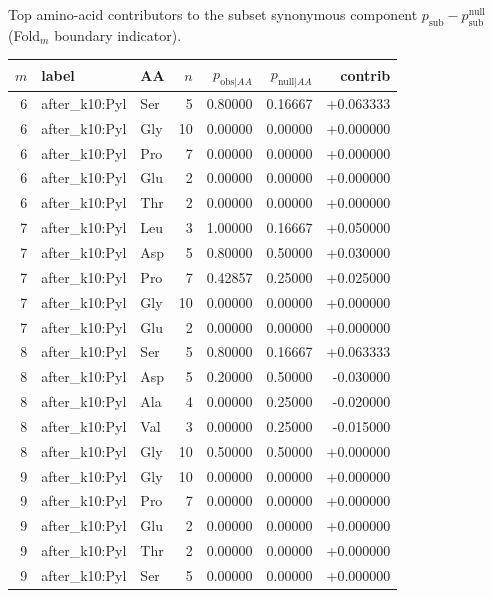 Top amino-acid contributors to the subset synonymous component $p_{\mathrm{sub}}-p^{\mathrm{null}}_{\mathrm{sub}}$ (Fold$_m$ boundary indicator).

\begingroup
{}
\scriptsize
\setlength{\tabcolsep}{4pt}
\renewcommand{\arraystretch}{1.10}
\setlength{\LTleft}{0pt}
\setlength{\LTright}{0pt}
\begin{longtable}{r l l r r r r}
\toprule
$m$ & label & AA & $n$ & $p_{\mathrm{obs}|AA}$ & $p_{\mathrm{null}|AA}$ & contrib \\
\midrule
6 & after\_k10:Pyl & Ser & 5 & 0.80000 & 0.16667 & +0.063333 \\
6 & after\_k10:Pyl & Gly & 10 & 0.00000 & 0.00000 & +0.000000 \\
6 & after\_k10:Pyl & Pro & 7 & 0.00000 & 0.00000 & +0.000000 \\
6 & after\_k10:Pyl & Glu & 2 & 0.00000 & 0.00000 & +0.000000 \\
6 & after\_k10:Pyl & Thr & 2 & 0.00000 & 0.00000 & +0.000000 \\
7 & after\_k10:Pyl & Leu & 3 & 1.00000 & 0.16667 & +0.050000 \\
7 & after\_k10:Pyl & Asp & 5 & 0.80000 & 0.50000 & +0.030000 \\
7 & after\_k10:Pyl & Pro & 7 & 0.42857 & 0.25000 & +0.025000 \\
7 & after\_k10:Pyl & Gly & 10 & 0.00000 & 0.00000 & +0.000000 \\
7 & after\_k10:Pyl & Glu & 2 & 0.00000 & 0.00000 & +0.000000 \\
8 & after\_k10:Pyl & Ser & 5 & 0.80000 & 0.16667 & +0.063333 \\
8 & after\_k10:Pyl & Asp & 5 & 0.20000 & 0.50000 & -0.030000 \\
8 & after\_k10:Pyl & Ala & 4 & 0.00000 & 0.25000 & -0.020000 \\
8 & after\_k10:Pyl & Val & 3 & 0.00000 & 0.25000 & -0.015000 \\
8 & after\_k10:Pyl & Gly & 10 & 0.50000 & 0.50000 & +0.000000 \\
9 & after\_k10:Pyl & Gly & 10 & 0.00000 & 0.00000 & +0.000000 \\
9 & after\_k10:Pyl & Pro & 7 & 0.00000 & 0.00000 & +0.000000 \\
9 & after\_k10:Pyl & Glu & 2 & 0.00000 & 0.00000 & +0.000000 \\
9 & after\_k10:Pyl & Thr & 2 & 0.00000 & 0.00000 & +0.000000 \\
9 & after\_k10:Pyl & Ser & 5 & 0.00000 & 0.00000 & +0.000000 \\

\end{longtable}
